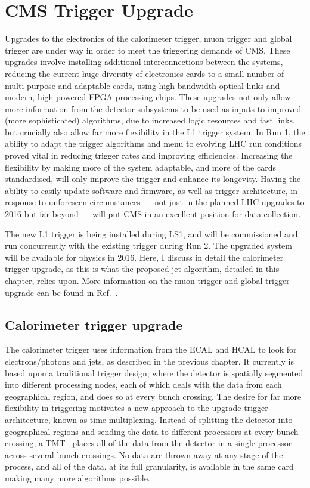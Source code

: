 \section{CMS Trigger Upgrade}
Upgrades to the electronics of the calorimeter trigger, muon trigger and global trigger are under way in order 
to meet the triggering demands of \ac{CMS}.
These upgrades involve installing additional interconnections between the systems, reducing the current huge diversity of electronics cards to a small number of multi-purpose and adaptable cards, using high bandwidth optical links and modern, high powered \ac{FPGA} processing chips. 
These upgrades not only allow more information from the detector subsystems to be used as inputs to improved (more sophisticated) algorithms, due to increased logic resources and fast links, 
but crucially also allow far more flexibility in the \ac{L1} trigger system. 
In Run 1, the ability to adapt the trigger algorithms and menu to evolving \ac{LHC} run conditions proved vital in reducing trigger rates and improving efficiencies. 
Increasing the flexibility by making more of the system adaptable, and more of the cards standardised, will only improve the trigger and enhance its longevity. 
Having the ability to easily update software and firmware, as well as trigger architecture, in response to unforeseen circumstances --- not just in the planned \ac{LHC} upgrades to 2016 but far beyond --- will put \ac{CMS} in an excellent position for data collection.

The new \ac{L1} trigger is being installed during \ac{LS1}, and will be commissioned and run concurrently with the existing trigger during Run 2. 
The upgraded system will be available for physics in 2016. %
Here, I discuss in detail the calorimeter trigger upgrade, as this is what the proposed jet algorithm, detailed in this chapter, relies upon.
More information on the muon trigger and global trigger upgrade can be found in Ref.~\cite{Tapper:1556311}.



\subsection{Calorimeter trigger upgrade}
The calorimeter trigger uses information from the \ac{ECAL} and \ac{HCAL} to look for electrons/photons and jets, as described in the previous chapter.
It currently is based upon a traditional trigger design; where the detector is spatially segmented into different processing nodes, each of which deals with the data from each geographical region, and does so at every bunch crossing.
The desire for far more flexibility in triggering motivates a new approach to the upgrade trigger architecture, known as time-multiplexing.
Instead of splitting the detector into geographical regions and sending the data to different processors at every bunch crossing, 
a \ac{TMT}~\cite{TMT_dem} places all of the data from the detector in a single processor across several bunch crossings.
No data are thrown away at any stage of the process, and all of the data, at its full granularity, is available in the same card making many more algorithms possible.


